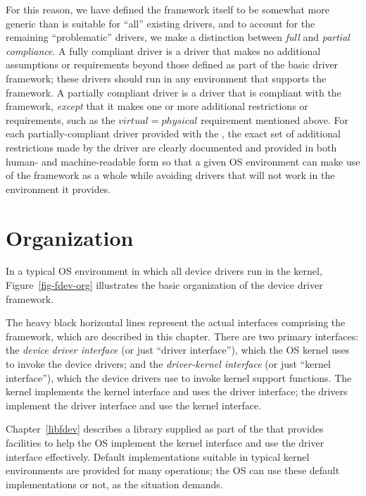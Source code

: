 For this reason, we have defined the framework itself
to be somewhat more generic than is suitable for ``all'' existing drivers,
and to account for the remaining ``problematic'' drivers,
we make a distinction between \emph{full} and \emph{partial compliance}.
A fully compliant driver
is a driver that makes no additional assumptions or requirements
beyond those defined as part of the basic driver framework;
these drivers should run in any environment that supports the framework.
A partially compliant driver
is a driver that is compliant with the framework,
\emph{except} that it makes one or more additional restrictions or requirements,
such as the $virtual=physical$ requirement mentioned above.
For each partially-compliant driver provided with the \oskit{},
the exact set of additional restrictions made by the driver
are clearly documented and provided in both human- and machine-readable form
so that a given OS environment can make use of the framework as a whole
while avoiding drivers that will not work in the environment it provides.

\section{Organization}

In a typical OS environment in which all device drivers run in the kernel,
Figure~\ref{fig-fdev-org} illustrates the basic organization
of the device driver framework.


The heavy black horizontal lines represent
the actual interfaces comprising the framework,
which are described in this chapter.
There are two primary interfaces:
the \emph{device driver interface} (or just ``driver interface''),
which the OS kernel uses to invoke the device drivers;
and the \emph{driver-kernel interface} (or just ``kernel interface''),
which the device drivers use to invoke kernel support functions.
The kernel implements the kernel interface and uses the driver interface;
the drivers implement the driver interface and use the kernel interface.

Chapter~\ref{libfdev}
describes a library supplied as part of the \oskit{}
that provides facilities to help the OS
implement the kernel interface and use the driver interface effectively.
Default implementations suitable in typical kernel environments
are provided for many operations;
the OS can use these default implementations or not,
as the situation demands.

